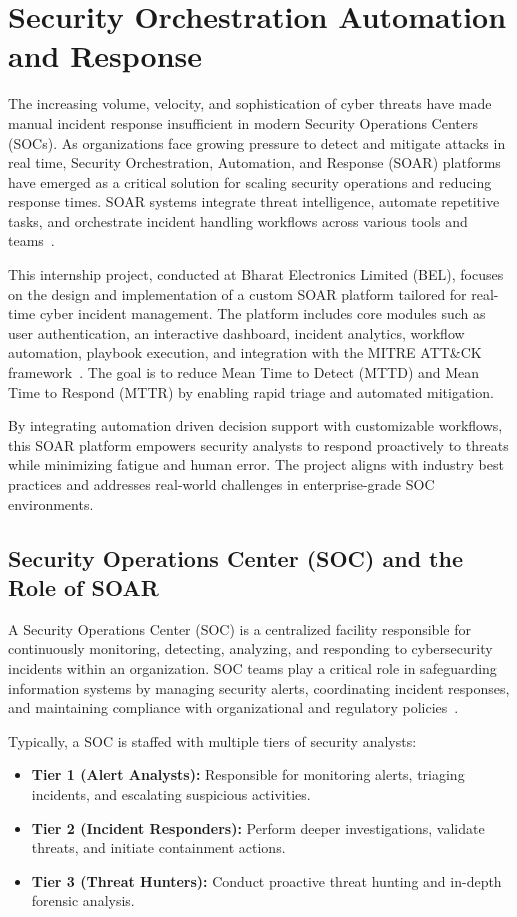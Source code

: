 \chapter{Security Orchestration Automation and Response}

The increasing volume, velocity, and sophistication of cyber threats have made manual incident response insufficient in modern Security Operations Centers (SOCs). As organizations face growing pressure to detect and mitigate attacks in real time, Security Orchestration, Automation, and Response (SOAR) platforms have emerged as a critical solution for scaling security operations and reducing response times. SOAR systems integrate threat intelligence, automate repetitive tasks, and orchestrate incident handling workflows across various tools and teams~\cite{paloalto_soar, ibm_soc}.

This internship project, conducted at Bharat Electronics Limited (BEL), focuses on the design and implementation of a custom SOAR platform tailored for real-time cyber incident management. The platform includes core modules such as user authentication, an interactive dashboard, incident analytics, workflow automation, playbook execution, and integration with the MITRE ATT\&CK framework~\cite{mitre_attack}. The goal is to reduce Mean Time to Detect (MTTD) and Mean Time to Respond (MTTR) by enabling rapid triage and automated mitigation.

By integrating automation driven decision support with customizable workflows, this SOAR platform empowers security analysts to respond proactively to threats while minimizing fatigue and human error. The project aligns with industry best practices and addresses real-world challenges in enterprise-grade SOC environments.

\section*{Security Operations Center (SOC) and the Role of SOAR}

A Security Operations Center (SOC) is a centralized facility responsible for continuously monitoring, detecting, analyzing, and responding to cybersecurity incidents within an organization. SOC teams play a critical role in safeguarding information systems by managing security alerts, coordinating incident responses, and maintaining compliance with organizational and regulatory policies~\cite{ibm_soc}.

Typically, a SOC is staffed with multiple tiers of security analysts:
\begin{itemize}[noitemsep, topsep=0pt]
    \item \textbf{Tier 1 (Alert Analysts):} Responsible for monitoring alerts, triaging incidents, and escalating suspicious activities.
    \item \textbf{Tier 2 (Incident Responders):} Perform deeper investigations, validate threats, and initiate containment actions.
    \item \textbf{Tier 3 (Threat Hunters):} Conduct proactive threat hunting and in-depth forensic analysis.
\end{itemize}

